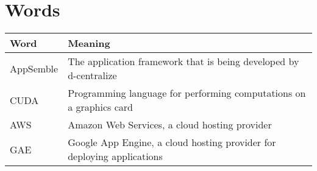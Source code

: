 \chapter{Words}
\begin{tabular}{|l|l|}
	\hline
	\textbf{Word} & \textbf{Meaning} \\
	\hline
	AppSemble & The application framework that is being developed by d-centralize \\ \hline
	CUDA & Programming language for performing computations on a graphics card \\ \hline
	AWS & Amazon Web Services, a cloud hosting provider \\ \hline
	GAE & Google App Engine, a cloud hosting provider for deploying applications \\ \hline
	
\end{tabular}